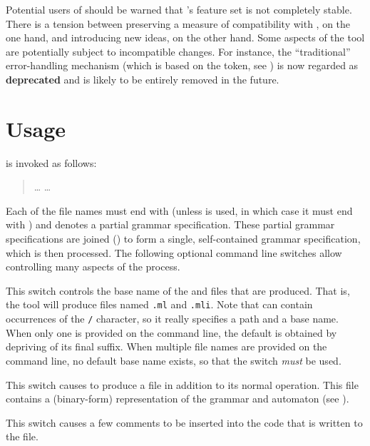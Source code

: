 \documentclass[onecolumn,11pt,nocopyrightspace,preprint]{sigplanconf}
\begin{document}
Potential users of \menhir should be warned that \menhir's feature set is not
completely stable. There is a tension between preserving a measure of
compatibility with \ocamlyacc, on the one hand, and introducing new ideas, on
the other hand. Some aspects of the tool are potentially subject to
incompatible changes. For instance, the ``traditional'' error-handling
mechanism (which is based on the \error token, see ) is now
regarded as \textbf{deprecated} and is likely to be entirely removed in the
future.


\section{Usage}

\menhir is invoked as follows:
\begin{quote}
\cmenhir {} \ldots {}  \ldots {}
\end{quote}
Each of the file names must end with \mly (unless \orocq is used,
in which case it must end with \vy) and denotes a partial
grammar specification. These partial grammar specifications are joined
() to form a single, self-contained grammar specification,
which is then processed. The following optional command line switches allow
controlling many aspects of the process.

 This switch controls the base name
of the \ml and \mli files that are produced. That is, the tool will produce
files named \texttt{.ml} and \texttt{.mli}. Note
that  can contain occurrences of the \texttt{/} character, so it
really specifies a path and a base name. When only one  is
provided on the command line, the default  is obtained by
depriving  of its final \mly suffix. When multiple file
names are provided on the command line, no default base name exists, so that
the \obase switch \emph{must} be used.

\docswitch{\ocmly} This switch causes \menhir to produce a \cmly file in
addition to its normal operation. This file contains a (binary-form)
representation of the grammar and automaton (see ).

\docswitch{\ocomment} This switch causes a few comments to be inserted into the
\ocaml code that is written to the \ml file.
\end{document}
